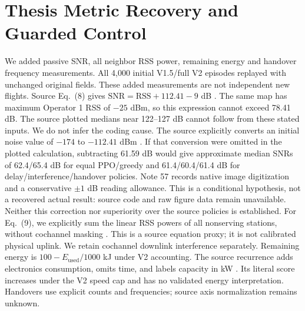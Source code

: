 \section{Thesis Metric Recovery and Guarded Control}
We added passive SNR, all neighbor RSS power, remaining energy and handover frequency measurements. All 4,000 initial V1.5/full V2 episodes replayed with unchanged original fields. These added measurements are not independent new flights.
Source Eq.~(8) gives $\mathrm{SNR}=\mathrm{RSS}+112.41-9$ dB \cite[p.~10, Eq.~(8); p.~15, Table~3]{thesis}. The same map has maximum Operator 1 RSS of $-25$ dBm, so this expression cannot exceed 78.41 dB. The source plotted medians near 122--127 dB \cite[pp.~18, 20, Figs.~6, 8]{thesis} cannot follow from these stated inputs. We do not infer the coding cause.
The source explicitly converts an initial noise value of $-174$ to $-112.41$ dBm \cite[p.~14, Sec.~6.1; p.~15, Table~3]{thesis}. If that conversion were omitted in the plotted calculation, subtracting 61.59 dB would give approximate median SNRs of 62.4/65.4 dB for equal PPO/greedy and 61.4/60.4/61.4 dB for delay/interference/handover policies. Note 57 records native image digitization and a conservative $\pm1$ dB reading allowance. This is a conditional hypothesis, not a recovered actual result: source code and raw figure data remain unavailable. Neither this correction nor superiority over the source policies is established.
For Eq.~(9), we explicitly sum the linear RSS powers of all nonserving stations, without cochannel masking \cite[p.~10, Eq.~(9)]{thesis}. This is a source equation proxy; it is not calibrated physical uplink. We retain cochannel downlink interference separately. Remaining energy is $100-E_{\mathrm{used}}/1000$ kJ under V2 accounting. The source recurrence adds electronics consumption, omits time, and labels capacity in kW \cite[p.~10, Eq.~(10); p.~15, Table~3]{thesis}. Its literal score increases under the V2 speed cap and has no validated energy interpretation. Handovers use explicit counts and frequencies; source axis normalization remains unknown.
